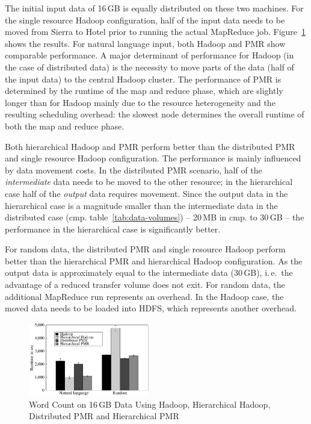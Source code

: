 \documentclass[]{paper}
\begin{document}
The initial input data of 16\,GB is equally distributed on these two machines. For the single resource
Hadoop configuration, half of the input data needs to be moved from
Sierra to Hotel prior to running the actual MapReduce
job.  Figure~\ref{fig:allmrs_rands} shows the results. For natural language
input, both Hadoop and PMR show comparable performance. A major
determinant of performance for Hadoop (in the case of distributed
data) is the necessity to move parts of the data (half of the input
data) to the central Hadoop cluster. The performance of PMR is
determined by the runtime of the map and reduce phase, which are
slightly longer than for Hadoop mainly due to the resource
heterogeneity and the resulting scheduling overhead: the slowest node
determines the overall runtime of both the map and reduce phase.

Both hierarchical Hadoop and PMR perform better than
the distributed PMR and single resource Hadoop configuration. The
performance is mainly influenced by data movement costs. In the
distributed PMR scenario, half of the {\it intermediate} data needs to
be moved to the other resource; in the hierarchical case half of the
{\it output} data requires movement. Since the output data in the
hierarchical case is a magnitude smaller than the intermediate data in
the distributed case (cmp. table~\ref{tab:data-volumes}) -- 20\,MB in
cmp. to 30\,GB -- the performance in the hierarchical case is
significantly better.

For random data, the distributed PMR and single resource Hadoop
perform better than the hierarchical PMR and hierarchical Hadoop
configuration. As the output data is approximately equal to the
intermediate data (30\,GB), i.\,e.\ the advantage of a reduced
transfer volume does not exit. For random data, the additional
MapReduce run represents an overhead. In the Hadoop case, the moved
data needs to be loaded into HDFS, which represents another overhead.


\begin{figure}[t]
	\centering
		\includegraphics[width=0.47\textwidth]{figures/allmrs_rands.pdf}
\caption{Word Count on 16\,GB Data Using Hadoop, Hierarchical Hadoop, Distributed PMR  and Hierarchical PMR} 	
\label{fig:allmrs_rands}
\end{figure}		
\end{document}
